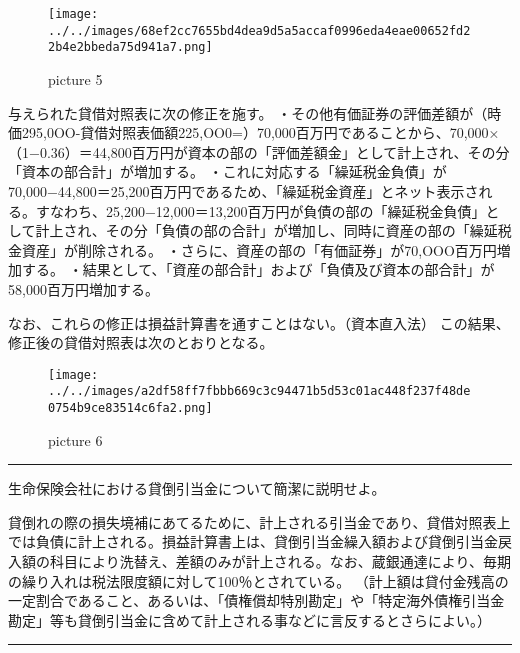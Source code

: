 \documentclass[report,gutter=10mm,fore-edge=10mm,uplatex,dvipdfmx]{jlreq}
\begin{document}
\begin{figure}
\centering
\texttt{[image: ../../images/68ef2cc7655bd4dea9d5a5accaf0996eda4eae00652fd22b4e2bbeda75d941a7.png]}
\caption{picture 5}
\end{figure}


与えられた貸借対照表に次の修正を施す。
・その他有価証券の評価差額が（時価295,0OO-貸借対照表価額225,OO0=）70,000百万円であることから、70,000×（1−0.36）＝44,800百万円が資本の部の「評価差額金」として計上され、その分「資本の部合計」が増加する。
・これに対応する「繰延税金負債」が70,000−44,800＝25,200百万円であるため、「繰延税金資産」とネット表示される。すなわち、25,200−12,000＝13,200百万円が負債の部の「繰延税金負債」として計上され、その分「負債の部の合計」が増加し、同時に資産の部の「繰延税金資産」が削除される。
・さらに、資産の部の「有価証券」が70,OOO百万円増加する。
・結果として、「資産の部合計」および「負債及び資本の部合計」が58,000百万円増加する。

なお、これらの修正は損益計算書を通すことはない。（資本直入法）
この結果、修正後の貸借対照表は次のとおりとなる。

\begin{figure}
\centering
\texttt{[image: ../../images/a2df58ff7fbbb669c3c94471b5d53c01ac448f237f48de0754b9ce83514c6fa2.png]}
\caption{picture 6}
\end{figure}

\begin{center}\rule{0.5\linewidth}{0.5pt}\end{center}


生命保険会社における貸倒引当金について簡潔に説明せよ。


貸倒れの際の損失境補にあてるために、計上される引当金であり、貸借対照表上では負債に計上される。損益計算書上は、貸倒引当金繰入額および貸倒引当金戻入額の科目により洗替え、差額のみが計上される。なお、蔵銀通達により、毎期の繰り入れは税法限度額に対して100％とされている。
（計上額は貸付金残高の一定割合であること、あるいは、「債権償却特別勘定」や「特定海外債権引当金勘定」等も貸倒引当金に含めて計上される事などに言反するとさらによい。）

\begin{center}\rule{0.5\linewidth}{0.5pt}\end{center}

\end{document}
